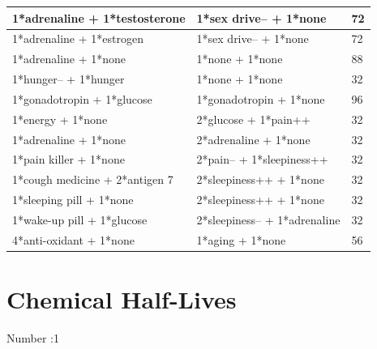 \documentclass{article}
\begin{document}
\begin{longtable}{|p{7cm}|p{7cm}|p{2cm}|}
1*adrenaline + 1*testosterone & 1*sex drive-- + 1*none & 72 \\ \hline
1*adrenaline + 1*estrogen & 1*sex drive-- + 1*none & 72 \\ \hline
1*adrenaline + 1*none & 1*none + 1*none & 88 \\ \hline
1*hunger-- + 1*hunger & 1*none + 1*none & 32 \\ \hline
1*gonadotropin + 1*glucose & 1*gonadotropin + 1*none & 96 \\ \hline
1*energy + 1*none & 2*glucose + 1*pain++ & 32 \\ \hline
1*adrenaline + 1*none & 2*adrenaline + 1*none & 32 \\ \hline
1*pain killer + 1*none & 2*pain-- + 1*sleepiness++ & 32 \\ \hline
1*cough medicine + 2*antigen 7 & 2*sleepiness++ + 1*none & 32 \\ \hline
1*sleeping pill + 1*none & 2*sleepiness++ + 1*none & 32 \\ \hline
1*wake-up pill + 1*glucose & 2*sleepiness-- + 1*adrenaline & 32 \\ \hline
4*anti-oxidant + 1*none & 1*aging + 1*none & 56 \\ \hline
\end{longtable}

\newpage

\section*{Chemical Half-Lives}

Number :1
\end{document}
